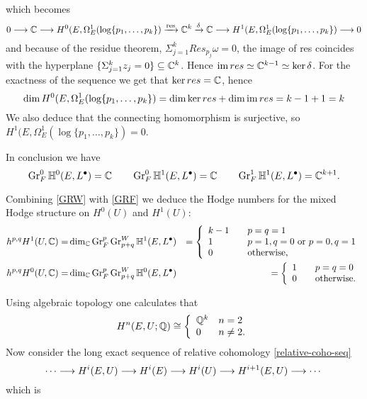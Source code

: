 \documentclass[../main.tex]{subfiles}
\begin{document}
\begin{es}


which becomes 
\[
0 \longrightarrow \mathbb{C} \longrightarrow H^0(E,\Omega^1_{E}(\log\{p_1,\ldots,p_k\}) \xrightarrow{\text{res}} \mathbb{C}^k
    \xrightarrow{\delta} \mathbb{C} \longrightarrow H^1(E,\Omega^1_{E}(\log\{p_1,\ldots,p_k\}) \longrightarrow 0
\]
and because of the residue theorem, $\Sigma_{j=1}^kRes_{p_j}\omega =0$, the image of res coincides with the hyperplane $\{\Sigma_{j=1}^k z_j = 0 \} \subseteq \mathbb{C}^k$. Hence $\operatorname{im} res \simeq \mathbb{C}^{k-1} \simeq \ker \delta$. For the exactness of the sequence we get that $\ker res =\mathbb{C}$, hence 
\[
\dim H^0(E,\Omega^1_{E}(\log\{p_1,\ldots,p_k\}) = \dim \ker res + \dim \operatorname{im} res = k-1+1=k
\]
We also deduce that the connecting homomorphism is surjective, so $H^1(E,\Omega^1_{E}(\log\{p_1,\ldots,p_k\}) = 0$.


In conclusion we have 
\begin{equation} \label{GRF}
\operatorname{Gr}^0_F \mathbb{H}^0(E,L^\bullet) = \mathbb{C} \qquad \operatorname{Gr}^0_F \mathbb{H}^1(E,L^\bullet) = \mathbb{C} \qquad \operatorname{Gr}^1_F \mathbb{H}^1(E,L^\bullet) = \mathbb{C}^{k+1}.
\end{equation}


Combining \eqref{GRW} with \eqref{GRF} we deduce the Hodge numbers for the mixed Hodge structure on $H^0(U)$ and $H^1(U)$:
\begin{eqnarray*}
h^{p,q}H^1(U,\mathbb{C}) =& \dim_{\mathbb{C}} \operatorname{Gr}_F^p\operatorname{Gr}^W_{p+q}\mathbb{H}^1(E,L^\bullet) &= \left\{\begin{array}{ll} k-1 &\quad p=q=1\\  1 &\quad p=1, q=0 \text{ or } p=0,q=1\\ 0&\quad\hbox{otherwise,}\end{array}\right.\\
h^{p,q}H^0(U,\mathbb{C}) =& \dim_{\mathbb{C}} \operatorname{Gr}_F^p\operatorname{Gr}^W_{p+q}\mathbb{H}^0(E,L^\bullet) &= \left\{\begin{array}{ll} 1 &\quad p=q=0\\ 0&\quad\hbox{otherwise.}\end{array}\right.
\end{eqnarray*}

 
Using algebraic topology one calculates that 
\[H^n(E,U;\mathbb{Q})\cong\left\{\begin{array}{ll} \mathbb{Q}^{k} & n=2\\ 0& n \neq 2.\end{array}\right. \]
Now consider the long exact sequence of relative cohomology \eqref{relative-coho-seq}
\[
\cdots\longrightarrow H^i(E,U)\longrightarrow H^i(E)\longrightarrow H^i(U)\longrightarrow H^{i+1}(E,U)\longrightarrow \cdots
\]
which is



\end{es}
\end{document}
